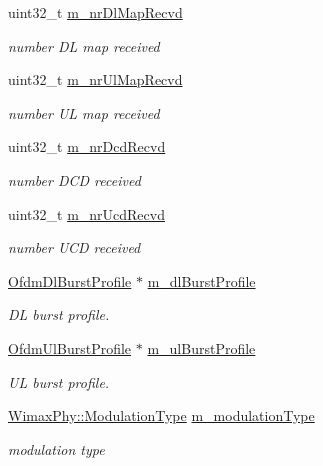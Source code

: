 \begin{DoxyCompactItemize}
uint32\+\_\+t \hyperlink{classns3_1_1SubscriberStationNetDevice_ad942e72712e5030482e1e21e6f103a0f}{m\+\_\+nr\+Dl\+Map\+Recvd}
\begin{DoxyCompactList}\small\item\em number DL map received \end{DoxyCompactList}\item 
uint32\+\_\+t \hyperlink{classns3_1_1SubscriberStationNetDevice_a4c70541a7463928920f717898b165ce2}{m\+\_\+nr\+Ul\+Map\+Recvd}
\begin{DoxyCompactList}\small\item\em number UL map received \end{DoxyCompactList}\item 
uint32\+\_\+t \hyperlink{classns3_1_1SubscriberStationNetDevice_a54cd018b94e92b304eeac4c1ecf6a3ef}{m\+\_\+nr\+Dcd\+Recvd}
\begin{DoxyCompactList}\small\item\em number D\+CD received \end{DoxyCompactList}\item 
uint32\+\_\+t \hyperlink{classns3_1_1SubscriberStationNetDevice_ae69ebeef2cbef56a5f92b5d6c078e4c9}{m\+\_\+nr\+Ucd\+Recvd}
\begin{DoxyCompactList}\small\item\em number U\+CD received \end{DoxyCompactList}\item 
\hyperlink{classns3_1_1OfdmDlBurstProfile}{Ofdm\+Dl\+Burst\+Profile} $\ast$ \hyperlink{classns3_1_1SubscriberStationNetDevice_ae317088c484842775e3ec776e34ecec7}{m\+\_\+dl\+Burst\+Profile}
\begin{DoxyCompactList}\small\item\em DL burst profile. \end{DoxyCompactList}\item 
\hyperlink{classns3_1_1OfdmUlBurstProfile}{Ofdm\+Ul\+Burst\+Profile} $\ast$ \hyperlink{classns3_1_1SubscriberStationNetDevice_a354cbcbc741bf7413d168af01c3cf353}{m\+\_\+ul\+Burst\+Profile}
\begin{DoxyCompactList}\small\item\em UL burst profile. \end{DoxyCompactList}\item 
\hyperlink{classns3_1_1WimaxPhy_a044c5d8a48ca992c39c2a946f6e755fa}{Wimax\+Phy\+::\+Modulation\+Type} \hyperlink{classns3_1_1SubscriberStationNetDevice_a51692a2abe6860fa3b7d7cd8960df8d1}{m\+\_\+modulation\+Type}
\begin{DoxyCompactList}\small\item\em modulation type \end{DoxyCompactList}\item 

\end{DoxyCompactItemize}
